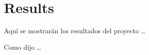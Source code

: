
\chapter{Results}
\label{cha:results}

Aquí se mostrarán los resultados del proyecto \ldots

Como dijo \cite{einstein} \ldots